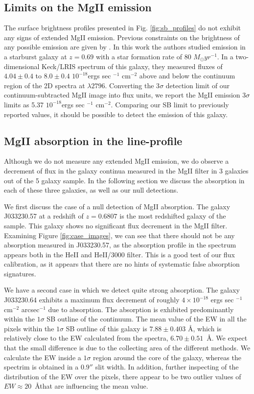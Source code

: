 \documentclass[twocolumn]{aastex6}
\begin{document}
\subsection{Limits on the MgII emission}
The surface brightness profiles presented in Fig. \ref{fig:sb_profiles} do not exhibit any signs of extended MgII emission. Previous constraints on the brightness of any possible emission are given by  \citep{Rubin_2011}. In this work the authors studied emission in a starburst galaxy at $z=0.69$ with a star formation rate of 80 $M_{\odot} yr^{-1}$. In a two-dimensional Keck/LRIS spectrum of this galaxy, they measured fluxes of $4.04 \pm 0.4$ to $8.0\pm 0.4$ $10^{-18}$ergs sec $^{-1}$ cm$^{-2}$  above and below the continuum region of the 2D spectra at $\lambda 2796$. Converting the 3$\sigma$ detection limit of our continuum-subtracted MgII image into flux units, we report the MgII emission 3$\sigma$ limits as 5.37 $10^{-18}$ergs sec $^{-1}$ cm$^{-2}$. Comparing our SB limit to previously reported values, it should be possible to detect the emission of this galaxy.

\subsection{MgII absorption in the line-profile}
Although we do not measure any extended MgII emission, we do observe a decrement of flux in the galaxy continua measured in the MgII filter in 3 galaxies out of the 5 galaxy sample. In the following section we discuss the absorption in each of these three galaxies, as well as our null detections.

We first discuss the case of a null detection of MgII absorption. The galaxy J033230.57 at a redshift of $z=0.6807$ is the most redshifted galaxy of the sample. This galaxy shows no significant flux decrement in the MgII filter. Examining Figure \ref{fig:case_images}, we can see that there should not be any absorption measured in J033230.57, as the absorption profile in the spectrum appears both in the HeII and HeII/3000 filter. This is a good test of our flux calibration, as it appears that there are no hints of systematic false absorption signatures.

We have a second case in which we detect quite strong absorption. The galaxy J033230.64 exhibits a maximum flux decrement of roughly $4\times10^{-18}$ ergs sec $^{-1}$ cm$^{-2}$ arcsec$^{-1}$ due to  absorption. The absorption is exhibited predominantly within the $1\sigma$ SB outline of the continuum. The mean value of the EW in all the pixels within the $1\sigma$ SB outline of this galaxy is $7.88 \pm 0.403$ \AA, which is relatively close to the EW calculated from the spectra, $6.70 \pm 0.51$\ \AA. We expect that the small difference is due to the collecting area of the different methods. We calculate the EW inside a $1\sigma$ region around the core of the galaxy, whereas the spectrim is obtained in a $0.9''$ slit width. In addition, further inspecting of the distribution of the EW over the pixels, there appear to be two outlier values of $EW\approx 20$\ \AA that are influencing the mean value.
\end{document}
